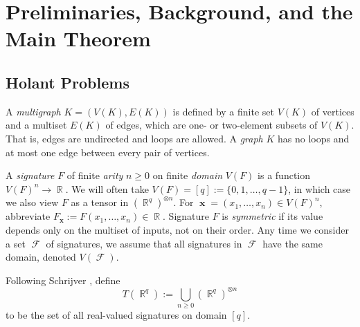 \documentclass{article}
\DeclareMathOperator{\rr}{\mathbb{R}}
\DeclareMathOperator{\vx}{\mathbf{x}}
\DeclareMathOperator{\fc}{\mathcal{F}}
\begin{document}
\section{Preliminaries, Background, and the Main Theorem}
\label{sec:preliminaries}
\subsection{Holant Problems}
\label{sec:holant}
A \emph{multigraph} $K = (V(K),E(K))$ is defined by a finite
set $V(K)$ of vertices and a multiset $E(K)$ of edges, 
which are one- or two-element subsets of 
$V(K)$. That is, edges are undirected and loops are allowed. A \emph{graph} $K$ has no
loops and at most one edge between every pair of vertices.

A \emph{signature} $F$ of finite \emph{arity} $n \geq 0$ on finite \emph{domain} $V(F)$ is a 
function $V(F)^n \to \rr$.
We will often take $V(F) = [q] := \{0,1,\ldots,q-1\}$, in which case we also view $F$ as a
tensor in $(\rr^q)^{\otimes n}$. For $\vx = (x_1,\ldots,x_n) \in V(F)^n$, abbreviate
$F_{\vx} := F(x_1,\ldots,x_n) \in \rr$. Signature $F$ is \emph{symmetric} if 
its value depends only on the multiset of inputs, not on their order.
Any time we consider a set $\fc$ of signatures,
we assume that all signatures in $\fc$ have the same domain, denoted $V(\fc)$. 
\begin{definition}[$T(\rr^q)$]
    Following Schrijver \cite{schrijver_tensor_2008}, define
    \[
        T(\rr^q) := \bigcup_{n \geq 0} (\rr^q)^{\otimes n}
    \]
    to be the set of all real-valued signatures on domain $[q]$.
\end{definition}
\end{document}
